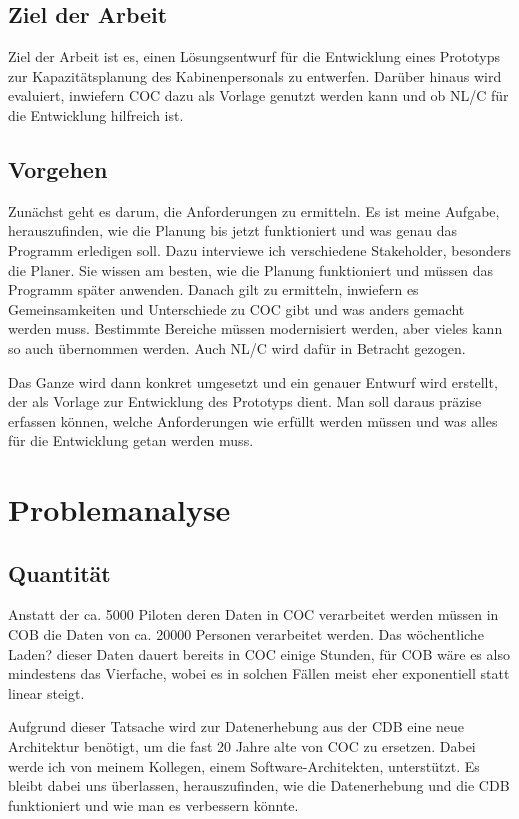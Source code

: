 \documentclass [12pt, a4paper, oneside, titlepage, ngerman]{article}
\begin{document}
\subsection {Ziel der Arbeit}
Ziel der Arbeit ist es, einen Lösungsentwurf für die Entwicklung eines Prototyps zur Kapazitätsplanung des Kabinenpersonals zu entwerfen. Darüber hinaus wird evaluiert, inwiefern COC dazu als Vorlage genutzt werden kann und ob NL/C für die Entwicklung hilfreich ist.

\subsection {Vorgehen}
Zunächst geht es darum, die Anforderungen zu ermitteln. Es ist meine Aufgabe, herauszufinden, wie die Planung bis jetzt funktioniert und was genau das Programm erledigen soll. Dazu interviewe ich verschiedene Stakeholder, besonders die Planer. Sie wissen am besten, wie die Planung funktioniert und müssen das Programm später anwenden. Danach gilt zu ermitteln, inwiefern es Gemeinsamkeiten und Unterschiede zu COC gibt und was anders gemacht werden muss. Bestimmte Bereiche müssen modernisiert werden, aber vieles kann so auch übernommen werden. Auch NL/C wird dafür in Betracht gezogen.

\noindent Das Ganze wird dann konkret umgesetzt und ein genauer Entwurf wird erstellt, der als Vorlage zur Entwicklung des Prototyps dient. Man soll daraus präzise erfassen können, welche Anforderungen wie erfüllt werden müssen und was alles für die Entwicklung getan werden muss.
\newpage

\section{Problemanalyse}
\subsection{Quantität}
Anstatt der ca. 5000 Piloten deren Daten in COC verarbeitet werden müssen in COB die Daten von ca. 20000 Personen verarbeitet werden. Das wöchentliche Laden? dieser Daten dauert bereits in COC einige Stunden, für COB wäre es also mindestens das Vierfache, wobei es in solchen Fällen meist eher exponentiell statt linear steigt.

\noindent Aufgrund dieser Tatsache wird zur Datenerhebung aus der CDB eine neue Architektur benötigt, um die fast 20 Jahre alte von COC zu ersetzen. Dabei werde ich von meinem Kollegen, einem Software-Architekten, unterstützt. Es bleibt dabei uns überlassen, herauszufinden, wie die Datenerhebung und die CDB funktioniert und wie man es verbessern könnte.
\end{document}
